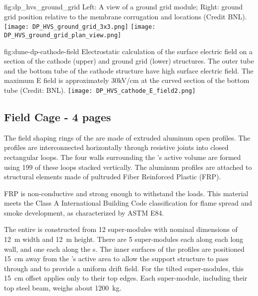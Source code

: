 \begin{dunefigure}{fig:dp_hvs_ground_grid}
{Left: A view of a ground grid module; Right: ground grid position relative to the membrane corrugation and  locations (Credit BNL).}
\texttt{[image: DP\_HVS\_ground\_grid\_3x3.png]}
\texttt{[image: DP\_HVS\_ground\_grid\_plan\_view.png]}
\end{dunefigure}


\begin{dunefigure}{fig:dune-dp-cathode-field}
{Electrostatic calculation of the surface electric field on a section of the cathode (upper) and ground grid (lower) structures. The outer tube and the bottom tube of the cathode structure have high surface electric field.   The maximum E field is approximately 30kV/cm  at the curved section of the bottom tube (Credit: BNL).} 
\texttt{[image: DP\_HVS\_cathode\_E\_field2.png]}
\end{dunefigure}


\subsection{Field Cage - 4 pages}

The field shaping rings of the  are made of extruded aluminum open profiles.  
The profiles are interconnected horizontally through resistive joints into closed rectangular loops. The four walls surrounding the 's active volume are formed using \num{199} of these loops stacked vertically. The aluminum profiles are attached to structural elements made of pultruded Fiber Reinforced Plastic (FRP). 

FRP is non-conductive and strong enough to withstand the  loads. %
This material meets the  Class A International Building Code classification for flame spread and smoke development, 
as characterized by ASTM E84. 

The entire  is constructed from \num{12} super-modules with nominal dimensions of \SI{12}{\m} width and \SI{12}{\m} height. There are \num{5} super-modules each along each long wall, and one each along the \endwall{}s.  The inner surfaces of the  profiles are positioned \SI{15}{\cm} away from the 's active area to allow the  support structure to pass through and to provide a uniform drift field.  For the tilted \endwall super-modules, this \SI{15}{\cm} offset applies only to their top edges. Each super-module, including their top steel beam, weighs about \SI{1200}{\kg}.

